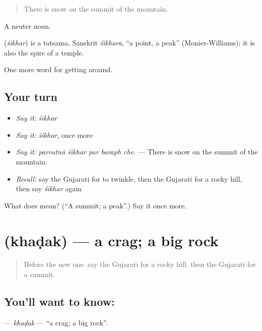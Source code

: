 \begin{quote}
There is snow on the summit of the mountain.
\end{quote}

A neuter noun.

\begin{cousinweb}
\textbf{} (\emph{śikhar}) is a tatsama, Sanskrit \emph{śikhara}, \textquotedblleft{}a point, a peak\textquotedblright{} (Monier-Williams); it is also the spire of a temple.
\end{cousinweb}

\begin{grammarlens}[title={What you've built}]
One more word for getting around.
\end{grammarlens}

\subsection*{Your turn}
\begin{itemize}
\raggedright
  \item \emph{Say it:} \emph{śikhar}
  \item \emph{Say it:} \emph{śikhar}, once more
  \item \emph{Say it:} \emph{parvatnā śikhar par baraph che.} — There is snow on the summit of the mountain.
  \item \emph{Recall:} say the Gujarati for to twinkle, then the Gujarati for a rocky hill, then say \emph{śikhar} again
\end{itemize}

\begin{tcolorbox}[breakable,colback=teal!4,colframe=teal!35!black,title={Before you move on}]
What does  mean? (\textquotedblleft{}A summit; a peak\textquotedblright{}.) Say it once more.
\end{tcolorbox}
\section[\texorpdfstring{\gu{ખડક} (khaḍak)}{ખડક (khaḍak)}]{ (khaḍak) — a crag; a big rock}

\label{lesson:GU-C439-khadak}



\begin{quote}
Before the new one: say the Gujarati for a rocky hill, then the Gujarati for a summit.
\end{quote}

\subsection*{You'll want to know: }
\textbf{} — \emph{khaḍak} — \textquotedblleft{}a crag; a big rock\textquotedblright{}.

